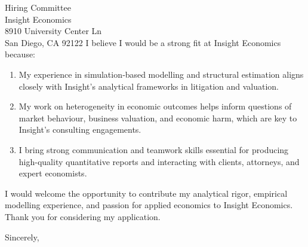 \documentclass[11pt,letterpaper]{letter}
\begin{document}
\begin{letter}{Hiring Committee \\
Insight Economics \\ 
8910 University Center Ln \\ 
San Diego, CA 92122}
I believe I would be a strong fit at Insight Economics because:
\begin{enumerate}
    \item My experience in simulation‐based modelling and structural estimation aligns closely with Insight’s analytical frameworks in litigation and valuation.
    \item My work on heterogeneity in economic outcomes helps inform questions of market behaviour, business valuation, and economic harm, which are key to Insight’s consulting engagements.
    \item I bring strong communication and teamwork skills essential for producing high-quality quantitative reports and interacting with clients, attorneys, and expert economists.
\end{enumerate}

I would welcome the opportunity to contribute my analytical rigor, empirical modelling experience, and passion for applied economics to Insight Economics. Thank you for considering my application.

\closing{Sincerely,}

\end{letter}
\end{document}
